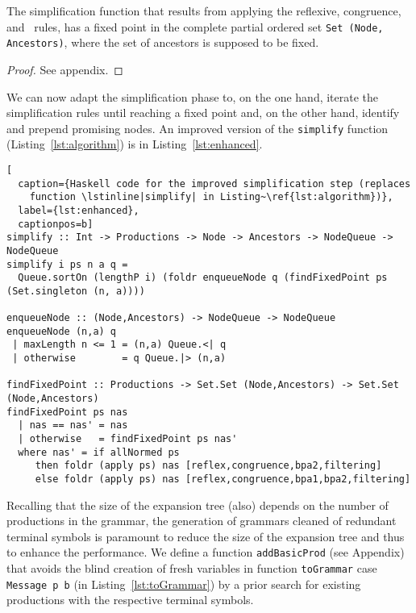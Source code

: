 
\begin{theorem}
  \label{thm:fixed_point}
  The simplification function that results from applying the
  reflexive, congruence, and \BPA\ rules, has a fixed point in the
  complete partial ordered set
  {\upshape\lstinline|Set (Node, Ancestors)|}, where the set of
  ancestors is supposed to be fixed. %
\end{theorem}
%
\begin{proof}
  See appendix.
\end{proof}

We can now adapt the
simplification phase to, on the one hand, iterate the simplification
rules until reaching a fixed point and, on the other hand, identify
and prepend promising nodes. An improved version of the
\lstinline|simplify| function (Listing~\ref{lst:algorithm}) is in
Listing~\ref{lst:enhanced}.

\begin{lstlisting}[
  caption={Haskell code for the improved simplification step (replaces
    function \lstinline|simplify| in Listing~\ref{lst:algorithm})},
  label={lst:enhanced},
  captionpos=b]
simplify :: Int -> Productions -> Node -> Ancestors -> NodeQueue -> NodeQueue
simplify i ps n a q =
  Queue.sortOn (lengthP i) (foldr enqueueNode q (findFixedPoint ps (Set.singleton (n, a))))

enqueueNode :: (Node,Ancestors) -> NodeQueue -> NodeQueue
enqueueNode (n,a) q 
 | maxLength n <= 1 = (n,a) Queue.<| q
 | otherwise        = q Queue.|> (n,a)

findFixedPoint :: Productions -> Set.Set (Node,Ancestors) -> Set.Set (Node,Ancestors)
findFixedPoint ps nas
  | nas == nas' = nas
  | otherwise   = findFixedPoint ps nas'
  where nas' = if allNormed ps
     then foldr (apply ps) nas [reflex,congruence,bpa2,filtering]
     else foldr (apply ps) nas [reflex,congruence,bpa1,bpa2,filtering]

\end{lstlisting}

Recalling that the size of the expansion tree (also) depends on the 
number of productions in the grammar, the generation of grammars cleaned
of redundant terminal symbols is paramount to reduce the size of the
expansion tree and thus to enhance the performance. We define a 
function \lstinline|addBasicProd| (see Appendix) that avoids the 
blind creation of 
fresh variables in function \lstinline|toGrammar| case 
\lstinline|Message p b| 
(in Listing~\ref{lst:toGrammar}) by a prior search for existing productions
with the respective terminal symbols.

